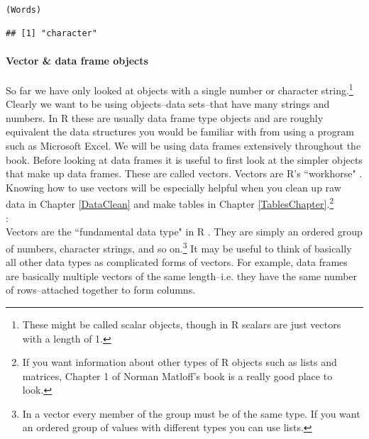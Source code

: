 \begin{knitrout}
\color{fgcolor}\begin{kframe}
\begin{alltt}
(Words)
\end{alltt}
\begin{verbatim}
## [1] "character"
\end{verbatim}
\end{kframe}
\end{knitrout}


\paragraph{Vector \& data frame objects}

So far we have only looked at objects with a single number or character string.\footnote{These might be called scalar objects, though in R scalars are just vectors with a length of 1.} Clearly we want to be using objects--data sets--that have many strings and numbers. In R these are usually data frame type objects and are roughly equivalent the data structures you would be familiar with from using a program such as Microsoft Excel. We will be using data frames extensively throughout the book. Before looking at data frames it is useful to first look at the simpler objects that make up data frames. These are called vectors. Vectors are R's ``workhorse" \cite[]{Matloff2011}. Knowing how to use vectors will be especially helpful when you clean up raw data in Chapter \ref{DataClean} and make tables in Chapter \ref{TablesChapter}.\footnote{If you want information about other types of R objects such as lists and matrices, Chapter 1 of Norman Matloff's book\citeyearpar{Matloff2011} is a really good place to look.} \\[0.25cm]

: \\[0.25cm] Vectors are the ``fundamental data type" in R \cite[]{Matloff2011}. They are simply an ordered group of numbers, character strings, and so on.\footnote{In a vector every member of the group must be of the same type. If you want an ordered group of values with different types you can use lists.} It may be useful to think of basically all other data types as complicated forms of vectors. For example, data frames are basically multiple vectors of the same length--i.e. they have the same number of rows--attached together to form columns. 

